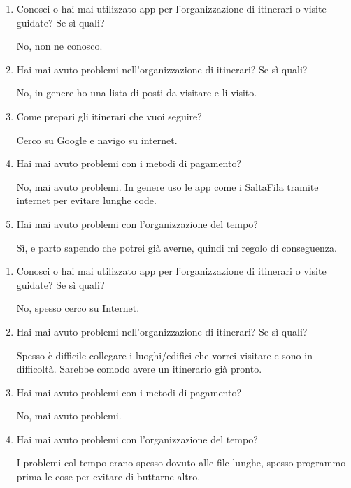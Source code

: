\begin{enumerate}

\item Conosci o hai mai utilizzato app per l'organizzazione di itinerari o visite guidate? Se sì quali?

No, non ne conosco.

\item Hai mai avuto problemi nell'organizzazione di itinerari? Se sì quali?

No, in genere ho una lista di posti da visitare e li visito.

\item Come prepari gli itinerari che vuoi seguire?

Cerco su Google e navigo su internet.

\item Hai mai avuto problemi con i metodi di pagamento?

No, mai avuto problemi. In genere uso le app come i SaltaFila tramite internet per evitare lunghe code.

\item Hai mai avuto problemi con l'organizzazione del tempo?

Sì, e parto sapendo che potrei già averne, quindi mi regolo di conseguenza.

\end{enumerate}


\begin{enumerate}

\item Conosci o hai mai utilizzato app per l'organizzazione di itinerari o visite guidate? Se sì quali?

No, spesso cerco su Internet.

\item Hai mai avuto problemi nell'organizzazione di itinerari? Se sì quali?

Spesso è difficile collegare i luoghi/edifici che vorrei visitare e sono in difficoltà. Sarebbe comodo avere un itinerario già pronto.

\item Hai mai avuto problemi con i metodi di pagamento?

No, mai avuto problemi.

\item Hai mai avuto problemi con l'organizzazione del tempo?

I problemi col tempo erano spesso dovuto alle file lunghe, spesso programmo prima le cose per evitare di buttarne altro.

\end{enumerate}

